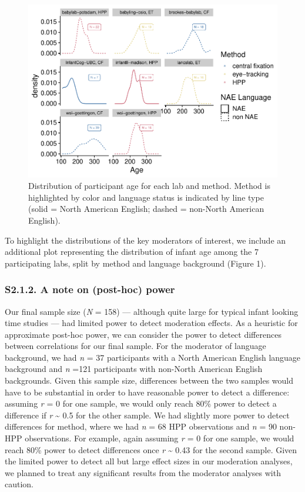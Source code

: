 \documentclass[
  man, donotrepeattitle,floatsintext]{apa6}
\begin{document}
\begin{figure}

{\centering \includegraphics{MB1T_supplement_files/figure-latex/unnamed-chunk-3-1} 

}

\caption{Distribution of participant age for each lab and method. Method is highlighted by color and  language status is indicated by line type (solid = North American English; dashed = non-North American English).}\label{fig:unnamed-chunk-3}
\end{figure}

To highlight the distributions of the key moderators of interest, we include an additional plot representing the distribution of infant age among the 7 participating labs, split by method and language background (Figure 1).

\hypertarget{s2.1.2.-a-note-on-post-hoc-power}{%
\subsubsection{S2.1.2. A note on (post-hoc) power}\label{s2.1.2.-a-note-on-post-hoc-power}}

Our final sample size (\emph{N} = 158) --- although quite large for typical infant looking time studies --- had limited power to detect moderation effects. As a heuristic for approximate post-hoc power, we can consider the power to detect differences between correlations for our final sample. For the moderator of language background, we had \emph{n} = 37 participants with a North American English language background and \emph{n} =121 participants with non-North American English backgrounds. Given this sample size, differences between the two samples would have to be substantial in order to have reasonable power to detect a difference: assuming \emph{r} = 0 for one sample, we would only reach 80\% power to detect a difference if \emph{r} \textasciitilde{} 0.5 for the other sample. We had slightly more power to detect differences for method, where we had \emph{n} = 68 HPP observations and \emph{n} = 90 non-HPP observations. For example, again assuming \emph{r} = 0 for one sample, we would reach 80\% power to detect differences once \emph{r} \textasciitilde{} 0.43 for the second sample. Given the limited power to detect all but large effect sizes in our moderation analyses, we planned to treat any significant results from the moderator analyses with caution.
\end{document}
